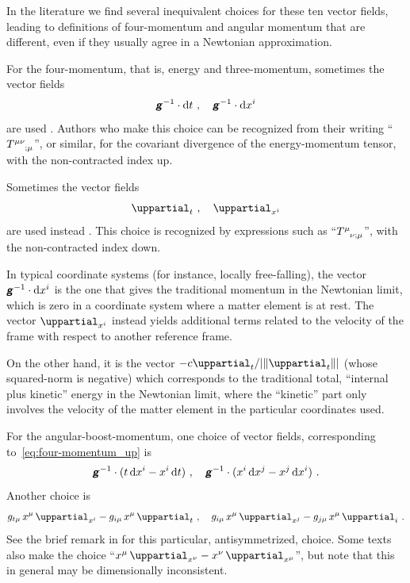 \documentclass[\ifafour a4paper,12pt,\else a5paper,10pt,\fi%
onecolumn,oneside,article,%
british%
]{memoir}
\theoremstyle{remark}
\theoremstyle{innote}
\newcommand*{\mathte}[1]{\textbf{\textit{\textsf{#1}}}}
\newcommand*{\de}{\uppartial}%
\newcommand*{\di}{\mathrm{d}}%
\DeclarePairedDelimiter\abs{\lvert}{\rvert}
\renewcommand*{\|}[1][]{\nonscript\:#1\vert\nonscript\:\mathopen{}}
\newcommand*{\sect}{\S}%
\newcommand*{\sects}{\S\S}%
\newcommand*{\chap}{ch.}%
\newcommand*{\eqn}{eq.}%
\renewcommand*{\i}{{}\indices}
\newcommand*{\se}[1]{\de_{#1}}
\newcommand*{\si}[1]{\di{#1}}
\newcommand*{\yg}{\mathte{g}}
\DeclarePairedDelimiter\nor{\lVert}{\rVert}
\begin{document}
In the literature we find several inequivalent choices for these ten vector fields, leading to definitions of four-momentum and angular momentum that are different, even if they usually agree in a Newtonian approximation.

For the four-momentum, that is, energy and three-momentum, sometimes the vector fields
\begin{equation}
  \label{eq:four-momentum_up}
  \yg^{-1}\cdot\si{t} \ ,\quad \yg^{-1}\cdot\si{x^{i}}
\end{equation}
are used \autocites[for instance in][\sect~5.3, \chap~20]{misneretal1970_r2017}[\sect~6.1.3]{poissonetal2014}. Authors who make this choice can be recognized from their writing \enquote{$T\i{^{\mu\nu}_{;\mu}}$}, or similar, for the covariant divergence of the energy-momentum tensor, with the non-contracted index up.

Sometimes the vector fields
\begin{equation}
  \label{eq:four-momentum_down}
  \se{t} \ ,\quad \se{x^{i}}
\end{equation}
are used instead \autocites[for instance in][\sect~3.2 after \eqn~(3.2)]{hawkingetal1973_r1994}. This choice is recognized by expressions such as \enquote{$T\i{^{\mu}_{\nu;\mu}}$}, with the non-contracted index down.

In typical coordinate systems (for instance, locally free-falling), the vector $\yg^{-1}\cdot\si{x^{i}}$ is the one that gives the traditional momentum in the Newtonian limit, which is zero in a coordinate system where a matter element is at rest. The vector $\se{x^{i}}$ instead yields additional terms related to the velocity of the frame with respect to another reference frame.

On the other hand, it is the vector $-c\se{t}/\abs{\nor{\se{t}}}$ (whose squared-norm is negative) which corresponds to the traditional total, \enquote{internal plus kinetic} energy in the Newtonian limit, where the \enquote{kinetic} part only involves the velocity of the matter element in the particular coordinates used.

For the angular-boost-momentum, one choice of vector fields, corresponding to~\eqref{eq:four-momentum_up} is
\begin{equation}
  \label{eq:ang-momentum_up}
  \yg^{-1}\cdot(t\,\si{x^{i}} - x^{i}\,\si{t})
\ ,\quad
  \yg^{-1}\cdot(x^{i}\,\si{x^{j}} - x^{j}\,\si{x^{i}}) \ .
\end{equation}
Another choice \autocites[\sect~3.9.6.3 before \eqn~(3.475)]{kopeikinetal2011} is
\begin{equation}
  \label{eq:ang-momentum_down}
  g_{t\mu}\,x^{\mu}\,\se{x^{i}} - g_{i\mu}\,x^{\mu}\,\se{t}
\ ,\quad
  g_{i\mu}\,x^{\mu}\,\se{x^{j}} - g_{j\mu}\,x^{\mu}\,\se{i} \ .
\end{equation}
See the brief remark in \cites[\sect~2.1.3 p.~160]{dixon1979b} for this particular, antisymmetrized, choice. Some texts \autocites[\sects~III.21, IX.62 p.~385]{burke1985_r1987}[\sect~3.2 after \eqn~(3.2)]{hawkingetal1973_r1994} also make the choice \enquote{$x^{\mu}\,\se{x^{\nu}} - x^{\nu}\,\se{x^{\mu}}$}, but note that this in general may be dimensionally inconsistent.
\end{document}
